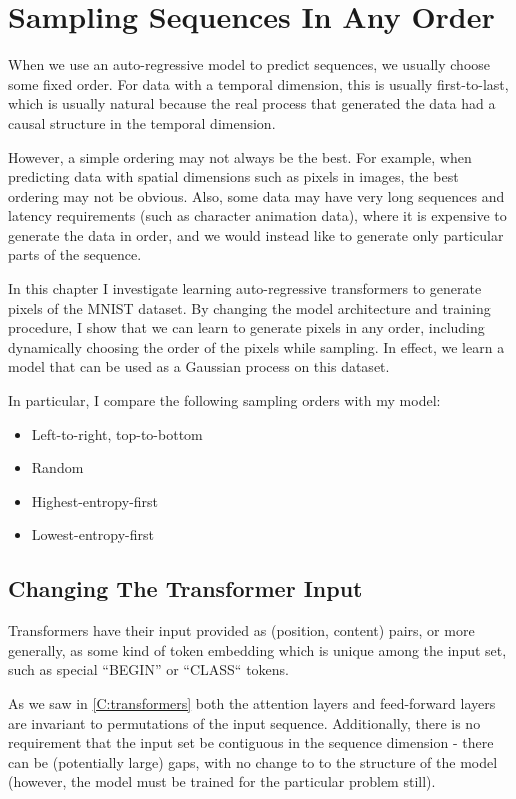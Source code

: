\chapter{Sampling Sequences In Any Order}
\label{C:a-o-sampling}

When we use an auto-regressive model to predict sequences, we usually choose some fixed order. For data with a temporal dimension, this is usually first-to-last, which is usually natural because the real process that generated the data had a causal structure in the temporal dimension.

However, a simple ordering may not always be the best. For example, when predicting data with spatial dimensions such as pixels in images, the best ordering may not be obvious. Also, some data may have very long sequences and latency requirements (such as character animation data), where it is expensive to generate the data in order, and we would instead like to generate only particular parts of the sequence.

In this chapter I investigate learning auto-regressive transformers to generate pixels of the MNIST dataset. By changing the model architecture and training procedure, I show that we can learn to generate pixels in any order, including dynamically choosing the order of the pixels while sampling. In effect, we learn a model that can be used as a Gaussian process on this dataset.

In particular, I compare the following sampling orders with my model:
\begin{itemize}
    \item Left-to-right, top-to-bottom
    \item Random
    \item Highest-entropy-first
    \item Lowest-entropy-first
\end{itemize}

\section{Changing The Transformer Input}
\label{s:transformer-inputs}

Transformers have their input provided as (position, content) pairs, or more generally, as some kind of token embedding which is unique among the input set, such as special ``BEGIN'' or ``CLASS`` tokens.

As we saw in \cref{C:transformers} both the attention layers and feed-forward layers are invariant to permutations of the input sequence. Additionally, there is no requirement that the input set be contiguous in the sequence dimension - there can be (potentially large) gaps, with no change to to the structure of the model (however, the model must be trained for the particular problem still).


